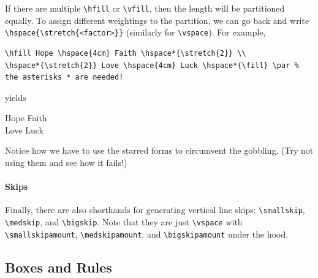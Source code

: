 If there are multiple \texttt{\textbackslash hfill} or \texttt{\textbackslash vfill}, then the length will be partitioned equally. To assign different weightings to the partition, we can go back and write \texttt{\textbackslash hspace\{\textbackslash stretch\{<factor>\}\}} (similarly for \texttt{\textbackslash vspace}). For example,
\begin{lstlisting}
\hfill Hope \hspace{4cm} Faith \hspace*{\stretch{2}} \\
\hspace*{\stretch{2}} Love \hspace{4cm} Luck \hspace*{\fill} \par % the asterisks * are needed!
\end{lstlisting}
yields \par
\hfill Hope \hspace{4cm} Faith  \\
 Love \hspace{4cm} Luck \hspace*{\fill} \par
Notice how we have to use the starred forms to circumvent the gobbling. (Try not using them and see how it fails!)

\paragraph{Skips} Finally, there are also shorthands for generating vertical line skips: \texttt{\textbackslash small\allowbreak skip}, \texttt{\textbackslash medskip}, and \texttt{\textbackslash bigskip}. Note that they are just \texttt{\textbackslash vspace} with \texttt{\textbackslash smallskipamount}, \texttt{\textbackslash medskipamount}, and \texttt{\textbackslash bigskipamount} under the hood.

\subsection{Boxes and Rules}

